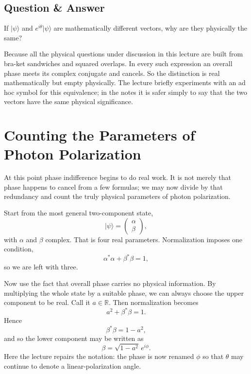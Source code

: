 \subsection{Question \& Answer}

If $|\psi\rangle$ and $e^{i\theta}|\psi\rangle$ are mathematically different vectors, why are they physically the same?

Because all the physical questions under discussion in this lecture are built from bra-ket sandwiches and squared overlaps. In every such expression an overall phase meets its complex conjugate and cancels. So the distinction is real mathematically but empty physically. The lecture briefly experiments with an ad hoc symbol for this equivalence; in the notes it is safer simply to say that the two vectors have the same physical significance.

\section{Counting the Parameters of Photon Polarization}

At this point phase indifference begins to do real work. It is not merely that phase happens to cancel from a few formulas; we may now divide by that redundancy and count the truly physical parameters of photon polarization.

Start from the most general two-component state,
\begin{equation}
|\psi\rangle=
\begin{pmatrix}
\alpha\\
\beta
\end{pmatrix},
\end{equation}
with $\alpha$ and $\beta$ complex. That is four real parameters. Normalization imposes one condition,
\begin{equation}
\alpha^*\alpha+\beta^*\beta=1,
\end{equation}
so we are left with three.

Now use the fact that overall phase carries no physical information. By multiplying the whole state by a suitable phase, we can always choose the upper component to be real. Call it $a\in\mathbb R$. Then normalization becomes
\begin{equation}
a^2+\beta^*\beta=1.
\end{equation}
Hence
\begin{equation}
\beta^*\beta=1-a^2,
\end{equation}
and so the lower component may be written as
\begin{equation}
\beta=\sqrt{1-a^2}\,e^{i\phi}.
\end{equation}
Here the lecture repairs the notation: the phase is now renamed $\phi$ so that $\theta$ may continue to denote a linear-polarization angle.

